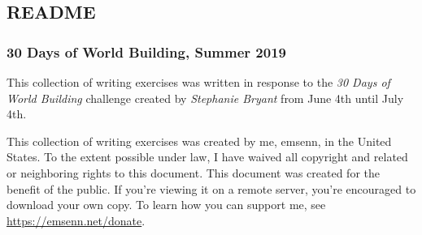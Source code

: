 \documentclass[11pt]{article}
\begin{document}
\subsection*{README}
\label{sec:org7a75f02}
\subsubsection*{30 Days of World Building, Summer 2019}
\label{sec:orgd923f1d}
This collection of writing exercises was written in response to the \emph{30 Days of World
Building} challenge created by \emph{Stephanie Bryant} from June 4th until
July 4th.

This collection of writing exercises was created by me, emsenn, in the United States. To the extent possible under law, I have waived all copyright and related or neighboring rights to this document. This document was created for the benefit of the public. If you're viewing it on a remote server, you're encouraged to download your own copy. To learn how you can support me, see \href{https://emsenn.net/donate}{https://emsenn.net/donate}.
\end{document}
